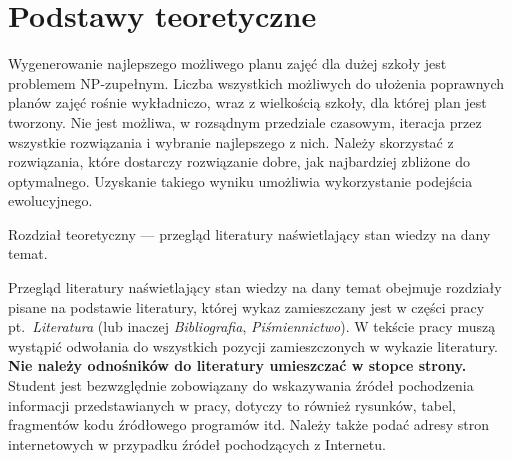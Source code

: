 

\chapter{Podstawy teoretyczne}
Wygenerowanie najlepszego możliwego planu zajęć dla dużej szkoły jest problemem NP-zupełnym. Liczba wszystkich możliwych do ułożenia poprawnych planów zajęć rośnie wykładniczo, wraz z wielkością szkoły, dla której plan jest tworzony. Nie jest możliwa, w rozsądnym przedziale czasowym, iteracja przez wszystkie rozwiązania i wybranie najlepszego z nich. Należy skorzystać z rozwiązania, które dostarczy rozwiązanie dobre, jak najbardziej zbliżone do optymalnego. Uzyskanie takiego wyniku umożliwia wykorzystanie podejścia ewolucyjnego.

Rozdział teoretyczny --- przegląd literatury naświetlający stan wiedzy na dany temat. 

Przegląd literatury naświetlający stan wiedzy na dany temat obejmuje rozdziały pisane na podstawie
literatury, której wykaz zamieszczany jest w części pracy pt.~\emph{Literatura} (lub inaczej \emph{Bibliografia},
\emph{Piśmiennictwo}). W tekście pracy muszą wystąpić odwołania do wszystkich pozycji zamieszczonych w
wykazie literatury. \textbf{Nie należy odnośników do literatury umieszczać w stopce strony.} Student jest
bezwzględnie zobowiązany do wskazywania źródeł pochodzenia informacji przedstawianych w pracy,
dotyczy to również rysunków, tabel, fragmentów kodu źródłowego programów itd. Należy także podać
adresy stron internetowych w przypadku źródeł pochodzących z Internetu.


